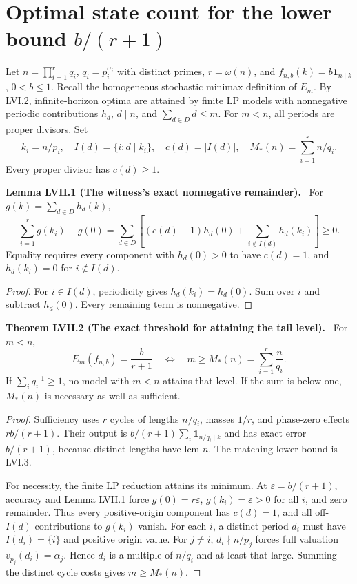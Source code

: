 \documentclass[11pt,a4paper,oneside]{book}
\newcommand{\one}{\mathbf 1}\newcommand{\ii}{\mathrm i}\newcommand{\dd}{\mathrm d}
\newcommand{\statement}[3]{\par\medskip\noindent\textbf{#1 #2 (#3).}\ }
\begin{document}
\section{Optimal state count for the lower bound $b/(r+1)$}
Let $n=\prod_{i=1}^rq_i$, $q_i=p_i^{\alpha_i}$ with distinct primes, $r=\omega(n)$, and $f_{n,b}(k)=b\one_{n\mid k}$, $0<b\le1$. Recall the homogeneous stochastic minimax definition of $E_m$. By LVI.2, infinite-horizon optima are attained by finite LP models with nonnegative periodic contributions $h_d$, $d\mid n$, and $\sum_{d\in D}d\le m$. For $m<n$, all periods are proper divisors. Set
\[k_i=n/p_i,\quad I(d)=\{i:d\mid k_i\},\quad c(d)=|I(d)|,\quad M_*(n)=\sum_{i=1}^rn/q_i.\]
Every proper divisor has $c(d)\ge1$.
\statement{Lemma}{LVII.1}{The witness's exact nonnegative remainder}
For $g(k)=\sum_{d\in D}h_d(k)$,
\begin{equation}\sum_{i=1}^rg(k_i)-g(0)=\sum_{d\in D}\left[(c(d)-1)h_d(0)+\sum_{i\notin I(d)}h_d(k_i)\right]\ge0.\tag{350}\end{equation}
Equality requires every component with $h_d(0)>0$ to have $c(d)=1$, and $h_d(k_i)=0$ for $i\notin I(d)$.
\begin{proof}
For $i\in I(d)$, periodicity gives $h_d(k_i)=h_d(0)$. Sum over $i$ and subtract $h_d(0)$. Every remaining term is nonnegative.
\end{proof}
\statement{Theorem}{LVII.2}{The exact threshold for attaining the tail level}
For $m<n$,
\begin{equation}E_m(f_{n,b})=\frac b{r+1}\quad\Longleftrightarrow\quad m\ge M_*(n)=\sum_{i=1}^r\frac n{q_i}.\tag{351}\end{equation}
If $\sum_iq_i^{-1}\ge1$, no model with $m<n$ attains that level. If the sum is below one, $M_*(n)$ is necessary as well as sufficient.
\begin{proof}
Sufficiency uses $r$ cycles of lengths $n/q_i$, masses $1/r$, and phase-zero effects $rb/(r+1)$. Their output is $b/(r+1)\sum_i\one_{n/q_i\mid k}$ and has exact error $b/(r+1)$, because distinct lengths have lcm $n$. The matching lower bound is LVI.3.

For necessity, the finite LP reduction attains its minimum. At $\varepsilon=b/(r+1)$, accuracy and Lemma LVII.1 force $g(0)=r\varepsilon$, $g(k_i)=\varepsilon>0$ for all $i$, and zero remainder. Thus every positive-origin component has $c(d)=1$, and all off-$I(d)$ contributions to $g(k_i)$ vanish. For each $i$, a distinct period $d_i$ must have $I(d_i)=\{i\}$ and positive origin value. For $j\ne i$, $d_i\nmid n/p_j$ forces full valuation $v_{p_j}(d_i)=\alpha_j$. Hence $d_i$ is a multiple of $n/q_i$ and at least that large. Summing the distinct cycle costs gives $m\ge M_*(n)$.
\end{proof}
\end{document}
